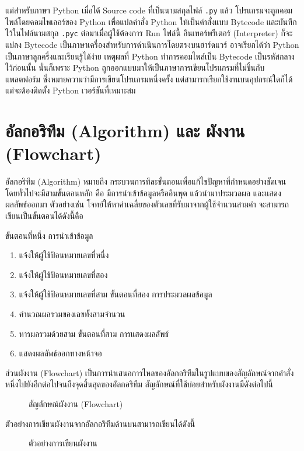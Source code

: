 แต่สำหรับภาษา Python เมื่อได้ Source code ที่เป็นนามสกุลไฟล์ \texttt{.py} แล้ว โปรแกรมจะถูกคอมไพล์โดยคอมไพเลอร์ของ Python เพื่อแปลคำสั่ง Python ให้เป็นคำสั่งแบบ Bytecode และบันทึกไว้ในไฟล์นามสกุล \texttt{.pyc} ต่อมาเมื่อผู้ใช้ต้องการ Run ไฟล์นี้ อินเทอร์พรีเตอร์ (Interpreter) ก็จะแปลง Bytecode เป็นภาษาเครื่องสำหรับการดำเนินการโดยตรงบนฮาร์ดแวร์ \cite{Bea13} อาจเรียกได้ว่า Python เป็นภาษาลูกครึ่งและเรียนรู้ได้ง่าย เหตุผลที่ Python ทำการคอมไพล์เป็น Bytecode เป็นรหัสกลางไว้ก่อนนั้น นั่นก็เพราะ Python ถูกออกแบบมาให้เป็นภาษาการเขียนโปรแกรมที่ไม่ขึ้นกับแพลตฟอร์ม ซึ่งหมายความว่ามีการเขียนโปรแกรมหนึ่งครั้ง แต่สามารถเรียกใช้งานบนอุปกรณ์ใดก็ได้ แต่จะต้องติดตั้ง Python เวอร์ชันที่เหมาะสม 

\section{อัลกอริทึม (Algorithm) และ ผังงาน (Flowchart)}

อัลกอริทึม (Algorithm) หมายถึง กระบวนการทีละขั้นตอนเพื่อแก้ไขปัญหาที่กำหนดอย่างชัดเจน โดยทั่วไปจะมีสามขั้นตอนหลัก คือ มีการนำเข้าข้อมูลหรืออินพุต แล้วนำมาประมวลผล และแสดงผลลัพธ์ออกมา \cite{Ari19} ตัวอย่างเช่น โจทย์ให้หาค่าเฉลี่ยของตัวเลขที่รับมาจากผู้ใช้จำนวนสามค่า จะสามารถเขียนเป็นขั้นตอนได้ดังนี้คือ

ขั้นตอนที่หนึ่ง การนำเข้าข้อมูล
\begin{enumerate}[noitemsep]
\item แจ้งให้ผู้ใช้ป้อนหมายเลขที่หนึ่ง
\item แจ้งให้ผู้ใช้ป้อนหมายเลขที่สอง
\item แจ้งให้ผู้ใช้ป้อนหมายเลขที่สาม
ขั้นตอนที่สอง การประมวลผลข้อมูล
\item คำนวณผลรวมของเลขทั้งสามจำนวน
\item หารผลรวมด้วยสาม
ขั้นตอนที่สาม การแสดงผลลัพธ์
\item แสดงผลลัพธ์ออกทางหน้าจอ
\end{enumerate}

ส่วนผังงาน (Flowchart) เป็นการนำเสนอการไหลของอัลกอริทึมในรูปแบบของสัญลักษณ์จากคำสั่งหนึ่งไปยังอีกต่อไปจนถึงจุดสิ้นสุดของอัลกอริทึม \cite{Cor09} สัญลักษณ์ที่ใช้บ่อยสำหรับผังงานมีดังต่อไปนี้

\begin{figure}[h]
\caption{สัญลักษณ์ผังงาน (Flowchart)}
\end{figure}


ตัวอย่างการเขียนผังงานจากอัลกอริทึมด้านบนสามารถเขียนได้ดังนี้

\begin{figure}[h]
\caption{ตัวอย่างการเขียนผังงาน}
\end{figure}



